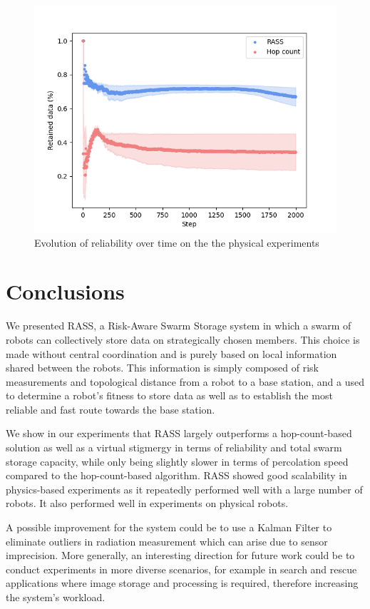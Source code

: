 \begin{figure}[htbp]
	\centering
    \includegraphics[width=\columnwidth]{figures/dora_mesh/reliability.png}
    \caption[RASS physical reliability]{Evolution of reliability over time on the the physical experiments}
    \label{results:physicalRelaibility}
\end{figure}

\section{Conclusions}
\label{conclusion}

We presented \ac{RASS}, a Risk-Aware Swarm Storage system in which a swarm of robots can collectively store data on strategically chosen members. This choice is made without central coordination and is purely based on local information shared between the robots. This information is simply composed of risk measurements and topological distance from a robot to a base station, and a used to determine a robot's fitness to store data as well as to establish the most reliable and fast route towards the base station.

We show in our experiments that \ac{RASS} largely outperforms a hop-count-based solution as well as a virtual stigmergy in terms of reliability and total swarm storage capacity, while only being slightly slower in terms of percolation speed compared to the hop-count-based algorithm. \ac{RASS} showed good scalability in physics-based experiments as it repeatedly performed well with a large number of robots. It also performed well in experiments on physical robots.

 A possible improvement for the system could be to use a Kalman Filter \cite{kalman1960new} to eliminate outliers in radiation measurement which can arise due to sensor imprecision. More generally, an interesting direction for future work could be to conduct experiments in more diverse scenarios, for example in search and rescue applications where image storage and processing is required, therefore increasing the system's workload.
